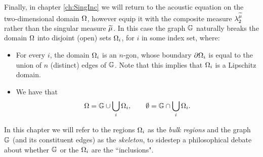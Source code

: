 Finally, in chapter \ref{ch:SingInc} we will return to the acoustic equation on the two-dimensional domain $\Omega$, however equip it with the composite measure $\lambda_2^{\widetilde{\mu}}$ rather than the singular measure $\widetilde{\mu}$.
In this case the graph $\mathbb{G}$ naturally breaks the domain $\Omega$ into disjoint (open) sets $\Omega_i$, for $i$ in some index set, where:
\begin{itemize}
	\item For every $i$, the domain $\Omega_i$ is an $n$-gon, whose boundary $\partial\Omega_i$ is equal to the union of $n$ (distinct) edges of $\mathbb{G}$.
	Note that this implies that $\Omega_i$ is a Lipschitz domain.
	\item We have that
	\begin{align*}
		\Omega = \mathbb{G} \cup \bigcup_{i}\Omega_i,
		\qquad
		\emptyset = \mathbb{G} \cap \bigcup_{i}\Omega_i.
	\end{align*}
\end{itemize}
In this chapter we will refer to the regions $\Omega_i$ as the \emph{bulk regions} and the graph $\mathbb{G}$ (and its constituent edges) as the \emph{skeleton}, to sidestep a philosophical debate about whether $\mathbb{G}$ or the $\Omega_i$ are the ``inclusions".
